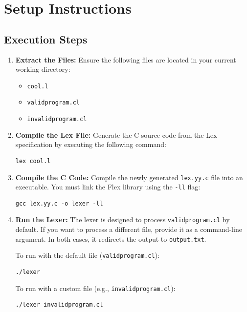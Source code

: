 \documentclass[12pt,a4paper]{article}
\begin{document}
\pagebreak

\section{Setup Instructions}


\subsection*{Execution Steps}
\begin{enumerate}
    \item \textbf{Extract the Files:} Ensure the following files are located in your current working directory:
    \begin{itemize}
        \item \texttt{cool.l}
        \item \texttt{validprogram.cl}
        \item \texttt{invalidprogram.cl}
    \end{itemize}

    \item \textbf{Compile the Lex File:} Generate the C source code from the Lex specification by executing the following command:
\begin{verbatim}
lex cool.l
\end{verbatim}

    \item \textbf{Compile the C Code:} Compile the newly generated \texttt{lex.yy.c} file into an executable. You must link the Flex library using the \texttt{-ll} flag:
\begin{verbatim}
gcc lex.yy.c -o lexer -ll
\end{verbatim}

    \item \textbf{Run the Lexer:} The lexer is designed to process \texttt{validprogram.cl} by default. If you want to process a different file, provide it as a command-line argument. In both cases, it redirects the output to \texttt{output.txt}.
    
    To run with the default file (\texttt{validprogram.cl}):
\begin{verbatim}
./lexer
\end{verbatim}
    
    To run with a custom file (e.g., \texttt{invalidprogram.cl}):
\begin{verbatim}
./lexer invalidprogram.cl
\end{verbatim}

\end{enumerate}
\end{document}
